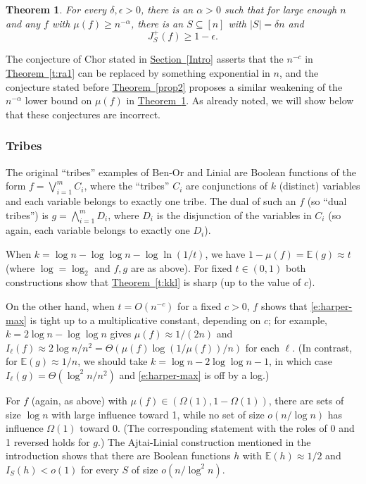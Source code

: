 \documentclass[11pt]{article}
\numberwithin{equation}{section}
\theoremstyle{definition}
\theoremstyle{plain}
\newcommand{\expref}[2]{\hyperref[#2]{#1~\ref{#2}}}
\newtheorem{thm}{Theorem}[section]
\newcommand{\mn}[0]{\medskip\noindent}
\newcommand{\sub}[0]{\subseteq}
\newcommand{\0}[0]{\emptyset}
\newcommand{\ga}[0]{\alpha }
\newcommand{\gO}[0]{\Omega}
\begin{document}
\begin {thm}
\label {t:ra2}
For every $\delta, \epsilon >0$,
there is an $\ga>0$ such that for large enough
$n$ and any
$f$ with $\mu(f) \geq  n^{-\ga}$,
there is an $S\sub [n]$ with $|S|=\delta n$ and
 $$J^+_S(f) \ge 1-\epsilon.$$
\end {thm}


\mn
The conjecture of
Chor stated in \expref{Section}{Intro}
asserts that the $n^{-c}$ in
\expref{Theorem}{t:ra1} can be replaced
by something exponential in $n$,
and the conjecture stated before
\expref{Theorem}{prop2} proposes a similar weakening
of the $n^{-\ga}$ lower bound on $\mu(f) $ in
\expref{Theorem}{t:ra2}.
As already noted, we
will show below that these conjectures are incorrect.



\subsubsection *{Tribes}
The original ``tribes'' examples of Ben-Or and Linial \cite{bl}
are Boolean functions of the form
$f= \bigvee_{i=1}^m C_i$, where the   %
``tribes'' $C_i$ are %
conjunctions %
of $k$ (distinct) variables
and
each variable belongs to exactly one tribe.
The dual of such an $f$ (so ``dual tribes'') is
%
$g= \bigwedge_{i=1}^m D_i$, where  %
$D_i$ is the %
disjunction %
of the variables in $C_i$
(so again, each variable belongs to exactly one $D_i$).

When $k=\log n - \log \log n - \log \ln (1/t)$,
we have $1-\mu(f)  = \mathbb E (g) \approx t$
(where $\log = \log_2$ and $f,g$ are as above).
For fixed $t\in (0,1)$ both constructions
show that \expref{Theorem}{t:kkl}
is sharp (up to the value of $c$).


On the other hand,
when $t=O(n^{-c})$ for a fixed
$c>0$, $f$ shows that \eqref{e:harper-max}
is tight up to a multiplicative constant, depending on $c$;
for example,
$k=2\log n-\log \log n$ gives
$\mu(f)  \approx 1/(2n)$ and
$I_\ell(f)\approx 2\log n/n^2=\Theta(\mu(f) \log(1/\mu(f) )/n)$
for each $\ell$.
(In contrast, for $\mathbb E (g)\approx 1/n$, we should
take $k= \log n-2\log \log n-1$, in which case
$I_\ell (g)=\Theta (\log^2n/n^2)$ and \eqref{e:harper-max}
is off by a log.)

For $f$ (again, as above) with $\mu(f)  \in (\gO(1),1-\gO(1))$,
there are sets of size $\log n$ with large influence
%
toward 1,  %
while no set of size $o(n/\log n)$ has
influence $\gO(1)$ %
toward 0.
(The corresponding statement with
the roles of 0 and 1 reversed holds for $g$.)
The Ajtai-Linial construction
mentioned in the introduction shows that there are Boolean functions
$h$ with $\mathbb E (h) \approx 1/2$ and $I_S(h) < o(1)$ for
every $S$ of size $o(n/\log^2n)$.
\end{document}
